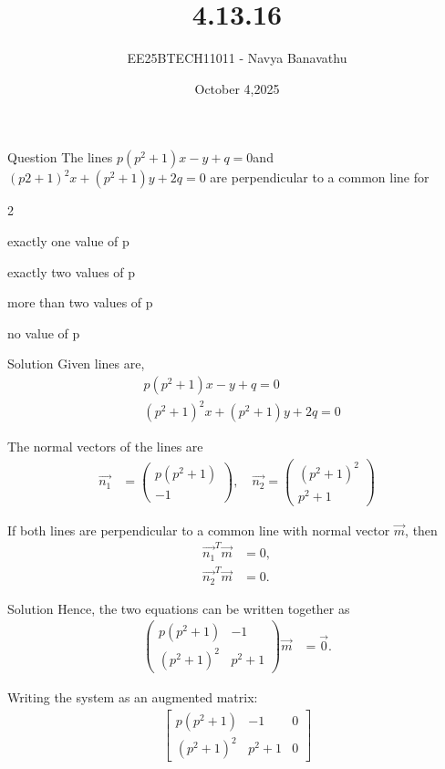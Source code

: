 \documentclass{beamer}
\title{4.13.16}
\date{October 4,2025}
\author{EE25BTECH11011 - Navya Banavathu}
\begin{document}
\frame{\titlepage}

\begin{frame}{Question}
 The lines $p(p^2+1)x - y+q=0$and $(p2+1)^2 x+(p^2+1) y+2q=0$ are perpendicular to a common line for
\begin{enumerate}
\begin{multicols}{2}
    \item exactly one value of p
    \item exactly two values of p
    \item more than two values of p 
    \item no value of p
    \end{multicols}
\end{enumerate}
\end{frame}

\begin{frame}{Solution}
Given lines are,
\begin{align}
& p(p^2+1)x - y + q = 0  \\
& (p^2+1)^2 x + (p^2+1)y + 2q = 0
\end{align}

The normal vectors of the lines are
\begin{align}
\vec{n_1} &= \begin{pmatrix} p(p^2+1)\\ -1 \end{pmatrix}, \quad
\vec{n_2} = \begin{pmatrix} (p^2+1)^2 \\ p^2+1 \end{pmatrix}
\end{align}

If both lines are perpendicular to a common line with normal vector $\vec{m}$, then
\begin{align}
\vec{n_1}^T \vec{m} &= 0, \\
\vec{n_2}^T \vec{m} &= 0.
\end{align}
\end{frame}

\begin{frame}{Solution}
Hence, the two equations can be written together as
\begin{align}
\begin{pmatrix}
p(p^2+1) & -1 \\
(p^2+1)^2 & p^2+1
\end{pmatrix}
\vec{m} &= \vec{0}.
\end{align}

Writing the system as an augmented matrix:
\begin{align}
\left[
\begin{array}{cc|c}
p(p^2 + 1) & -1 & 0 \\
(p^2 + 1)^2 & p^2 + 1 & 0
\end{array}
\right]
\end{align}

\end{frame}
\end{document}
